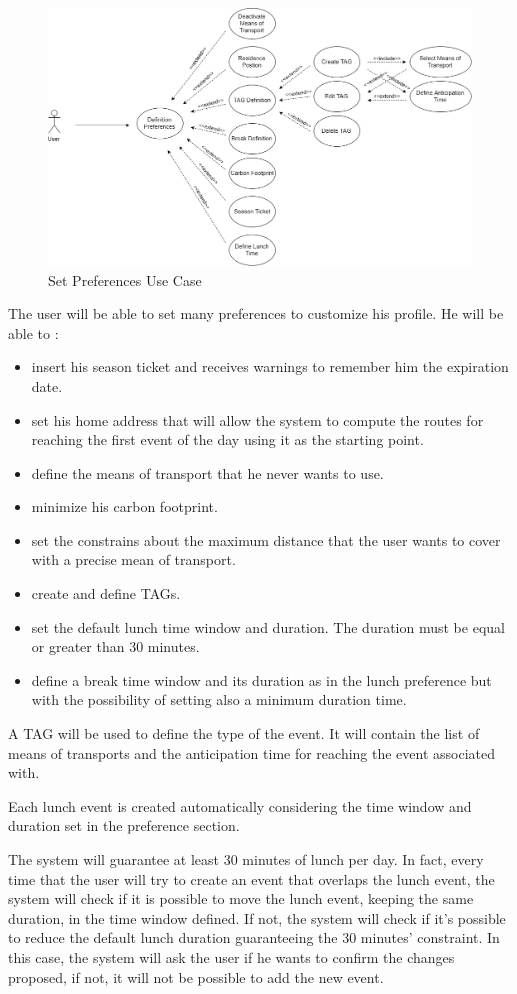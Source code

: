 \begin{figure}[H]
	\centering
	\includegraphics[scale=0.25]{Images/Use_Case/Set_Preferences}
	\caption{Set Preferences Use Case}
\end{figure}
The user will be able to set many preferences to customize his profile. 
He will be able to :
\begin{itemize}
	\setlength{\leftskip}{1cm}
	\item insert his season ticket and receives warnings to remember him the expiration date.
	\item set his home address that will allow the system to compute the routes for reaching the first event of the day using it as the starting point.
	\item define the means of transport that he never wants to use.
	\item minimize his carbon footprint.
	\item set the constrains about the maximum distance that the user wants to cover with a precise mean of transport.
	\item create and define TAGs.
	\item set the default lunch time window and duration. The duration must be equal or greater than 30 minutes.
	\item define a break time window and its duration as in the lunch preference but with the possibility of setting also a minimum duration time.
\end{itemize}\par
A TAG will be used to define the type of the event. It will contain the list of means of transports and the anticipation time for reaching the event associated with.

\newpage
{}
Each lunch event is created automatically considering the time window and duration set in the preference section.\par
The system will guarantee at least 30 minutes of lunch per day. In fact, every time that the user will try to create an event that overlaps the lunch event, the system will check if it is possible to move the lunch event, keeping the same duration, in the time window defined. If not, the system will check if it’s possible to reduce the default lunch duration guaranteeing the 30 minutes’ constraint. In this case, the system will ask the user if he wants to confirm the changes proposed, if not, it will not be possible to add the new event.


